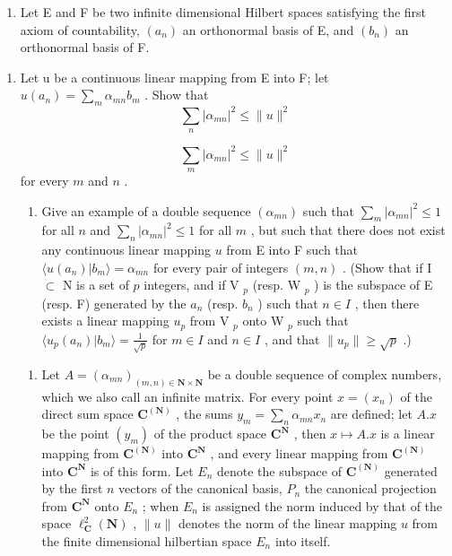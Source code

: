 \exercisegroup

\begin{enumerate}
\def\labelenumi{\arabic{enumi})}
\tightlist
\item
  Let E and F be two infinite dimensional Hilbert spaces satisfying the first axiom of countability, \((a_{n})\) an orthonormal basis of E, and \((b_{n})\) an orthonormal basis of F.
\end{enumerate}

\begin{enumerate}
\def\labelenumi{\alph{enumi})}
\tightlist
\item
  Let u be a continuous linear mapping from E into F; let \(u(a_{n}) = \sum_{m} \alpha_{mn} b_{m}\) . Show that
\[
\sum_ {n} | \alpha_ {m n} | ^ {2} \leqslant \| u \| ^ {2}
\]

\[
\sum_ {m} | \alpha_ {m n} | ^ {2} \leqslant \| u \| ^ {2}
\]
for every \(m\) and \(n\) .

\begin{enumerate}
\def\labelenumi{\alph{enumi})}
\setcounter{enumi}{1}
\tightlist
\item
  Give an example of a double sequence \((\alpha_{mn})\) such that \(\sum_{m} |\alpha_{mn}|^{2} \leqslant 1\) for all \(n\) and \(\sum_{n} |\alpha_{mn}|^{2} \leqslant 1\) for all \(m\) , but such that there does not exist any continuous linear mapping \(u\) from E into F such that \(\langle u(a_n)|b_m\rangle = \alpha_{mn}\) for every pair of integers \((m, n)\) . (Show that if I \(\subset\) N is a set of \(p\) integers, and if V \(_p\) (resp. W \(_p\) ) is the subspace of E (resp. F) generated by the \(a_n\) (resp. \(b_n\) ) such that \(n \in I\) , then there exists a linear mapping \(u_p\) from V \(_p\) onto W \(_p\) such that \(\langle u_p(a_n)|b_m\rangle = \frac{1}{\sqrt{p}}\) for \(m \in I\) and \(n \in I\) , and that \(\|u_p\| \geqslant \sqrt{p}\) .)
\end{enumerate}

\begin{enumerate}
\def\labelenumi{\arabic{enumi})}
\setcounter{enumi}{1}
\tightlist
\item
  Let \(A = (\alpha_{mn})_{(m,n)\in \mathbf{N}\times \mathbf{N}}\) be a double sequence of complex numbers, which we also call an infinite matrix. For every point \(x = (x_{n})\) of the direct sum space \(\mathbf{C}^{(\mathbf{N})}\) , the sums \(y_{m} = \sum_{n}\alpha_{mn}x_{n}\) are defined; let \(A.x\) be the point \((y_{m})\) of the product space \(\mathbf{C}^{\mathbf{N}}\) , then \(x\mapsto A.x\) is a linear mapping from \(\mathbf{C}^{(\mathbf{N})}\) into \(\mathbf{C}^{\mathbf{N}}\) , and every linear mapping from \(\mathbf{C}^{(\mathbf{N})}\) into \(\mathbf{C}^{\mathbf{N}}\) is of this form. Let \(E_{n}\) denote the subspace of \(\mathbf{C}^{(\mathbf{N})}\) generated by the first \(n\) vectors of the canonical basis, \(P_{n}\) the canonical projection from \(\mathbf{C}^{\mathbf{N}}\) onto \(E_{n}\) ; when \(E_{n}\) is assigned the norm induced by that of the space \(\ell_{\mathbf{C}}^{2}(\mathbf{N})\) , \(\| u\|\) denotes the norm of the linear mapping \(u\) from the finite dimensional hilbertian space \(E_{n}\) into itself.
\end{enumerate}


\end{enumerate}
